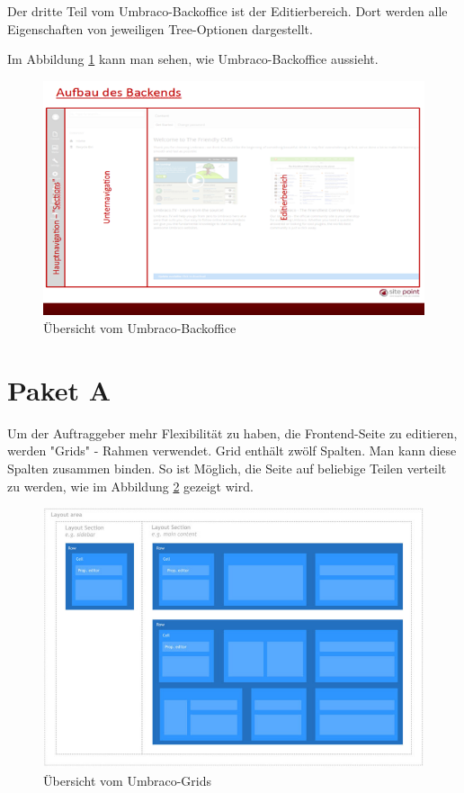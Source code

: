Der dritte Teil vom Umbraco-Backoffice ist der Editierbereich. Dort werden alle Eigenschaften von jeweiligen Tree-Optionen dargestellt.

Im Abbildung \ref{fig:Umbraco Backoffice} kann man sehen, wie Umbraco-Backoffice aussieht.
\begin{figure}[h]
	\centering
	\includegraphics[width=1\linewidth]{Graphics/UmbracoBackend.png}
	\caption[Umbraco Backoffice]{Übersicht vom Umbraco-Backoffice}
	\label{fig:Umbraco Backoffice}
\end{figure}

\pagebreak
\section{Paket A}
Um der Auftraggeber mehr Flexibilität zu haben, die Frontend-Seite zu editieren, werden "Grids" - Rahmen verwendet. Grid enthält zwölf Spalten. Man kann diese Spalten zusammen binden. So ist Möglich, die Seite auf beliebige Teilen verteilt zu werden, wie im Abbildung \ref{fig:GridsLayout} gezeigt wird.

\begin{figure}[h]
	\centering
	\includegraphics[width=1\linewidth]{Graphics/GridsLayout.png}
	\caption[GridsLayout]{Übersicht vom Umbraco-Grids}
	\label{fig:GridsLayout}
\end{figure}

